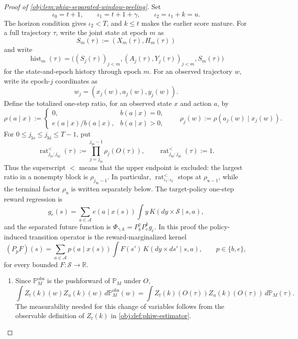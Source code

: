 \documentclass[11pt]{article}
\begin{document}
\begin{proof}[Proof of \cref{obj:lem:phiw-separated-window-peeling}]
Set
\[
\iota_0=t+1,\qquad \iota_1=t+1+\gamma,\qquad \iota_2=\iota_1+k=u .
\]
The horizon condition gives \(\iota_2<T\), and \(k\le t\) makes the earlier score mature.  For a full trajectory \(\tau\), write the joint state at epoch \(m\) as
\[
S_m(\tau):=(X_m(\tau),H_m(\tau))
\]
and write
\[
\operatorname{hist}_m(\tau)
=
\bigl((S_j(\tau))_{j<m},(A_j(\tau),Y_j(\tau))_{j<m},S_m(\tau)\bigr)
\]
for the state-and-epoch history through epoch \(m\).  For an observed trajectory \(w\), write its epoch-\(j\) coordinates as
\[
w_j=(x_j(w),a_j(w),y_j(w)).
\]
Define the totalized one-step ratio, for an observed state \(x\) and action \(a\), by
\[
\rho(a\mid x)
:=
\begin{cases}
0, & b(a\mid x)=0,\\
e(a\mid x)/b(a\mid x), & b(a\mid x)>0,
\end{cases}
\qquad
\rho_j(w):=\rho(a_j(w)\mid x_j(w)).
\] For
\(0\le j_{\mathrm{lo}}\le j_{\mathrm{hi}}\le T-1\), put
\[
\operatorname{rat}^{<}_{j_{\mathrm{lo}}:j_{\mathrm{hi}}}(\tau)
:=
\prod_{j=j_{\mathrm{lo}}}^{j_{\mathrm{hi}}-1}\rho_j(O(\tau)),
\qquad
\operatorname{rat}^{<}_{j_{\mathrm{hi}}:j_{\mathrm{hi}}}(\tau):=1 .
\]
Thus the superscript \({<}\) means that the upper endpoint is excluded: the largest ratio in a
nonempty block is \(\rho_{j_{\mathrm{hi}}-1}\). In particular,
\(\operatorname{rat}^{<}_{\iota_1:\iota_2}\) stops at \(\rho_{u-1}\), while the terminal factor
\(\rho_u\) is written separately below. The target-policy one-step reward regression is
\[
g_e(s)=
\sum_{a\in\mathcal A}e(a\mid x(s))
\int y\,K(dy\times\mathcal S\mid s,a),
\]
and the separated future function is \(\Phi_{\gamma,k}=P_b^\gamma P_e^k g_e\).  In this proof the policy-induced transition operator is the reward-marginalized kernel
\[
(P_pF)(s)
=
\sum_{a\in\mathcal A}p(a\mid x(s))
\int F(s')\,K(dy\times ds'\mid s,a),
\qquad p\in\{b,e\},
\]
for every bounded \(F:\mathcal S\to\mathbb R\).

\begin{enumerate}
\item Since \(\mathbb P_M^{\mathrm{obs}}\) is the pushforward of \(\mathbb P_M\) under \(O\),
\[
\int Z_t(k)(w)Z_u(k)(w)\,d\mathbb P_M^{\mathrm{obs}}(w)
=
\int Z_t(k)(O(\tau))Z_u(k)(O(\tau))\,d\mathbb P_M(\tau).
\]
The measurability needed for this change of variables follows from the observable definition of \(Z_t(k)\) in \cref{obj:def:phiw-estimator}.


\end{enumerate}
\end{proof}
\end{document}
